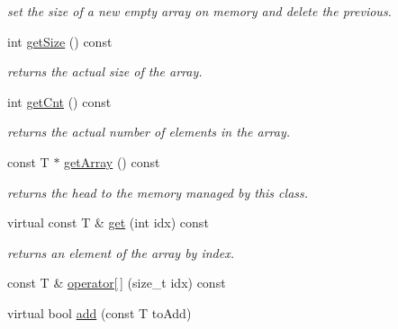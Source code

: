 \begin{DoxyCompactItemize}
\begin{DoxyCompactList}\small\item\em set the size of a new empty array on memory and delete the previous. \end{DoxyCompactList}\item 
\hypertarget{classplist_1_1PointerArray_a57d278aeccfc54b31586353fe769a46b}{int \hyperlink{classplist_1_1PointerArray_a57d278aeccfc54b31586353fe769a46b}{get\-Size} () const }\label{classplist_1_1PointerArray_a57d278aeccfc54b31586353fe769a46b}

\begin{DoxyCompactList}\small\item\em returns the actual size of the array. \end{DoxyCompactList}\item 
\hypertarget{classplist_1_1PointerArray_ae292a9687af89e4d89be471fb26c2dc9}{int \hyperlink{classplist_1_1PointerArray_ae292a9687af89e4d89be471fb26c2dc9}{get\-Cnt} () const }\label{classplist_1_1PointerArray_ae292a9687af89e4d89be471fb26c2dc9}

\begin{DoxyCompactList}\small\item\em returns the actual number of elements in the array. \end{DoxyCompactList}\item 
\hypertarget{classplist_1_1PointerArray_a9f95508f0c1310d3f714c37982a3fba1}{const T $\ast$ \hyperlink{classplist_1_1PointerArray_a9f95508f0c1310d3f714c37982a3fba1}{get\-Array} () const }\label{classplist_1_1PointerArray_a9f95508f0c1310d3f714c37982a3fba1}

\begin{DoxyCompactList}\small\item\em returns the head to the memory managed by this class. \end{DoxyCompactList}\item 
\hypertarget{classplist_1_1PointerArray_a74fb1ba107aafa9a08d1ca13f51eec19}{virtual const T \& \hyperlink{classplist_1_1PointerArray_a74fb1ba107aafa9a08d1ca13f51eec19}{get} (int idx) const }\label{classplist_1_1PointerArray_a74fb1ba107aafa9a08d1ca13f51eec19}

\begin{DoxyCompactList}\small\item\em returns an element of the array by index. \end{DoxyCompactList}\item 
const T \& \hyperlink{classplist_1_1PointerArray_a1521f4e8c50da69f5a8b82aecad1ba9b}{operator\mbox{[}$\,$\mbox{]}} (size\-\_\-t idx) const 
\item 
\hypertarget{classplist_1_1PointerArray_a1f54fb5e285e55798f89c1d8d3896d95}{virtual bool \hyperlink{classplist_1_1PointerArray_a1f54fb5e285e55798f89c1d8d3896d95}{add} (const T to\-Add)}\label{classplist_1_1PointerArray_a1f54fb5e285e55798f89c1d8d3896d95}


\end{DoxyCompactItemize}

